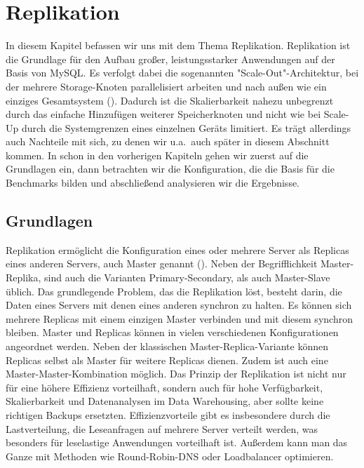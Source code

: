
\chapter{Replikation}\label{ch:replikation}
In diesem Kapitel befassen wir uns mit dem Thema Replikation.
Replikation ist die Grundlage für den Aufbau großer, leistungsstarker Anwendungen auf der Basis von MySQL\@.
Es verfolgt dabei die sogenannten "Scale-Out"-Architektur, bei der mehrere Storage-Knoten parallelisiert arbeiten und nach außen wie ein einziges Gesamtsystem (\cite{scale_out_eigenschaften}).
Dadurch ist die Skalierbarkeit nahezu unbegrenzt durch das einfache Hinzufügen weiterer Speicherknoten und nicht wie bei Scale-Up durch die Systemgrenzen eines einzelnen Geräts limitiert.
Es trägt allerdings auch Nachteile mit sich, zu denen wir u.a.\ auch später in diesem Abschnitt kommen.
In schon in den vorherigen Kapiteln gehen wir zuerst auf die Grundlagen ein, dann betrachten wir die Konfiguration, die die Basis für die Benchmarks bilden und abschließend analysieren wir die Ergebnisse.

\section{Grundlagen}\label{sec:replication-grundlagen}
Replikation ermöglicht die Konfiguration eines oder mehrere Server als Replicas eines anderen Servers, auch Master genannt (\cite[pp. 447--477]{schwartz2012high}).
Neben der Begrifflichkeit Master-Replika, sind auch die Varianten Primary-Secondary, als auch Master-Slave üblich.
Das grundlegende Problem, das die Replikation löst, besteht darin, die Daten eines Servers mit denen eines anderen synchron zu halten.
Es können sich mehrere Replicas mit einem einzigen Master verbinden und mit diesem synchron bleiben.
Master und Replicas können in vielen verschiedenen Konfigurationen angeordnet werden.
Neben der klassischen Master-Replica-Variante können Replicas selbst als Master für weitere Replicas dienen.
Zudem ist auch eine Master-Master-Kombination möglich.
Das Prinzip der Replikation ist nicht nur für eine höhere Effizienz vorteilhaft, sondern auch für hohe Verfügbarkeit, Skalierbarkeit und Datenanalysen im Data Warehousing, aber sollte keine richtigen Backups ersetzten.
Effizienzvorteile gibt es insbesondere durch die Lastverteilung, die Leseanfragen auf mehrere Server verteilt werden, was besonders für leselastige Anwendungen vorteilhaft ist.
Außerdem kann man das Ganze mit Methoden wie Round-Robin-DNS oder Loadbalancer optimieren.


